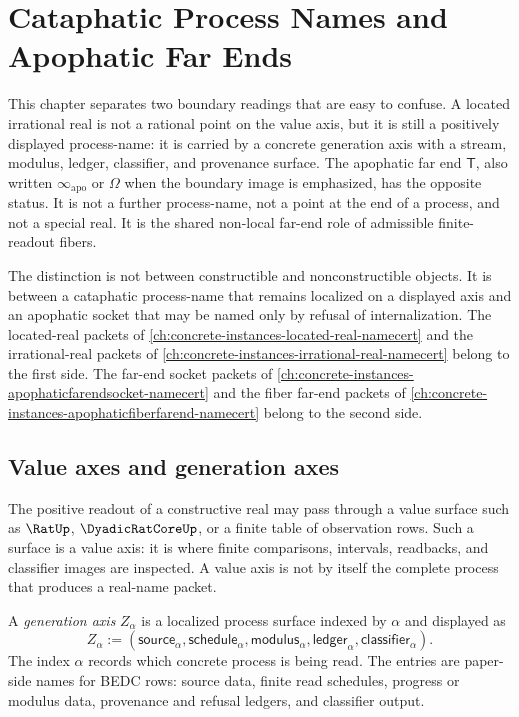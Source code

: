 \chapter{Cataphatic Process Names and Apophatic Far Ends}
\label{ch:visions-apophatic-cataphatic-process-far-end}

This chapter separates two boundary readings that are easy to confuse. A
located irrational real is not a rational point on the value axis, but it is
still a positively displayed process-name: it is carried by a concrete
generation axis with a stream, modulus, ledger, classifier, and provenance
surface. The apophatic far end $\mathsf{T}$, also written
$\infty_{\mathrm{apo}}$ or $\Omega$ when the boundary image is emphasized, has
the opposite status. It is not a further process-name, not a point at the end
of a process, and not a special real. It is the shared non-local far-end role
of admissible finite-readout fibers.

The distinction is not between constructible and nonconstructible objects. It
is between a cataphatic process-name that remains localized on a displayed
axis and an apophatic socket that may be named only by refusal of
internalization. The located-real packets of
\autoref{ch:concrete-instances-located-real-namecert} and the
irrational-real packets of \autoref{ch:concrete-instances-irrational-real-namecert}
belong to the first side. The far-end socket packets of
\autoref{ch:concrete-instances-apophaticfarendsocket-namecert} and the fiber
far-end packets of \autoref{ch:concrete-instances-apophaticfiberfarend-namecert}
belong to the second side.

\section{Value axes and generation axes}
\label{sec:cataphatic-process-value-generation-axes}

The positive readout of a constructive real may pass through a value surface
such as $\RatUp$, $\DyadicRatCoreUp$, or a finite table of observation rows.
Such a surface is a value axis: it is where finite comparisons, intervals,
readbacks, and classifier images are inspected. A value axis is not by itself
the complete process that produces a real-name packet.

\begin{definition}
\label{def:cataphatic-process-generation-axis}
A \emph{generation axis} $Z_\alpha$ is a localized process surface indexed by
$\alpha$ and displayed as
$$
Z_\alpha :=
(\mathsf{source}_\alpha,
\mathsf{schedule}_\alpha,
\mathsf{modulus}_\alpha,
\mathsf{ledger}_\alpha,
\mathsf{classifier}_\alpha).
$$
The index $\alpha$ records which concrete process is being read. The entries
are paper-side names for BEDC rows: source data, finite read schedules,
progress or modulus data, provenance and refusal ledgers, and classifier
output.
\end{definition}

